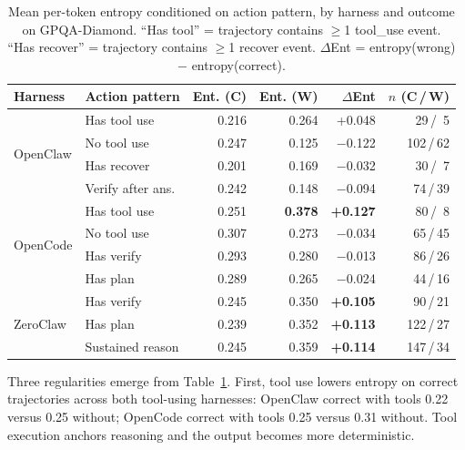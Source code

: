 \begin{table}[t]
\centering
\small
\caption{%
  Mean per-token entropy conditioned on action pattern, by harness and outcome
  on GPQA-Diamond.
  ``Has tool'' = trajectory contains $\ge$1 tool\_use event.
  ``Has recover'' = trajectory contains $\ge$1 recover event.
  $\Delta$Ent = entropy(wrong) $-$ entropy(correct).
}
\label{tab:gpqa-action-entropy}
\setlength{\tabcolsep}{3pt}
\begin{tabular}{llrrrr}
\toprule
Harness & Action pattern & Ent. (C) & Ent. (W) & $\Delta$Ent & $n$ (C\,/\,W) \\
\midrule
\multirow{4}{*}{OpenClaw}
  & Has tool use      & 0.216 & 0.264 & +0.048 & 29\,/\, 5 \\
  & No tool use       & 0.247 & 0.125 & $-$0.122 & 102\,/\,62 \\
  & Has recover       & 0.201 & 0.169 & $-$0.032 & 30\,/\, 7 \\
  & Verify after ans. & 0.242 & 0.148 & $-$0.094 & 74\,/\,39 \\
\midrule
\multirow{4}{*}{OpenCode}
  & Has tool use      & 0.251 & \textbf{0.378} & \textbf{+0.127} & 80\,/\, 8 \\
  & No tool use       & 0.307 & 0.273 & $-$0.034 & 65\,/\,45 \\
  & Has verify        & 0.293 & 0.280 & $-$0.013 & 86\,/\,26 \\
  & Has plan          & 0.289 & 0.265 & $-$0.024 & 44\,/\,16 \\
\midrule
\multirow{3}{*}{ZeroClaw}
  & Has verify        & 0.245 & 0.350 & \textbf{+0.105} & 90\,/\,21 \\
  & Has plan          & 0.239 & 0.352 & \textbf{+0.113} & 122\,/\,27 \\
  & Sustained reason  & 0.245 & 0.359 & \textbf{+0.114} & 147\,/\,34 \\
\bottomrule
\end{tabular}
\end{table}


Three regularities emerge from Table~\ref{tab:gpqa-action-entropy}.
First, tool use lowers entropy on correct trajectories across both tool-using
harnesses: OpenClaw correct with tools 0.22 versus 0.25 without; OpenCode
correct with tools 0.25 versus 0.31 without.
Tool execution anchors reasoning and the output becomes more deterministic.

